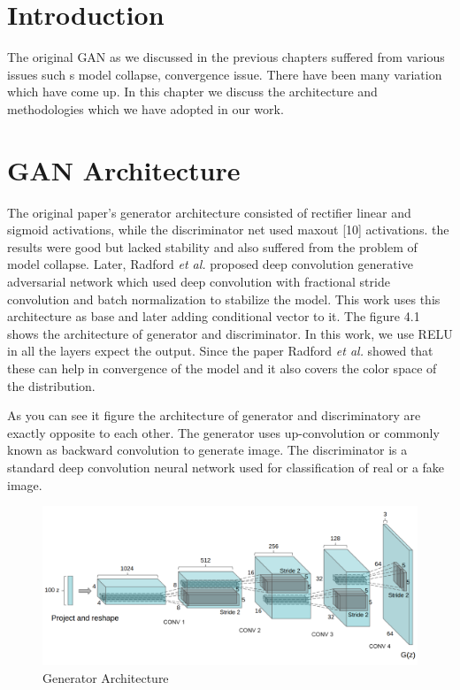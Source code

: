 
\section{Introduction}
The original GAN as we discussed in the previous chapters suffered from various issues such s model collapse, convergence issue. There have been many variation which have come up. In this chapter we discuss the architecture and methodologies which we have adopted in our work.  


\section{GAN Architecture} 

The original paper's\cite{Original-GAN} generator architecture consisted of  rectifier linear\cite{RELU} and sigmoid activations, while the discriminator net used maxout [10] activations. the results were good but lacked stability and also suffered from the problem of model collapse.
Later, Radford \textit{et al.}\cite{DCGAN} proposed deep convolution generative adversarial network which used deep convolution with fractional stride convolution and batch normalization to stabilize the model. This work uses this architecture as base and later adding conditional vector to it. The figure 4.1 shows the architecture of generator and discriminator. In this work, we use RELU
in all the layers expect the output. Since the paper Radford \textit{et al.}\cite{DCGAN} showed that these can help in convergence of the model and it also covers the color space of the distribution.
\par

As you can see it figure the architecture of generator and discriminatory are exactly opposite to each other. The generator uses up-convolution or commonly known as backward convolution to generate image.%
The discriminator is a standard deep convolution neural network used for classification of real or  a fake image.
\begin{figure}
  \centering
    \includegraphics[scale=.7, angle=0]{Files/Generator-Architecture.png}
    \caption[Generator Architecture]{Generator Architecture\cite{DCGAN}}
    \label{fig: DCGAN}
\end{figure}

